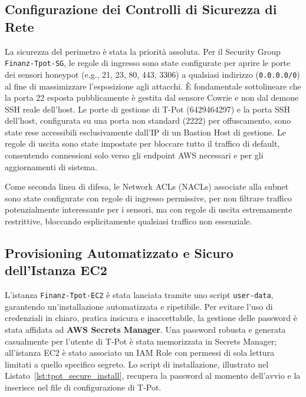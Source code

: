 \subsection{Configurazione dei Controlli di Sicurezza di Rete}
La sicurezza del perimetro è stata la priorità assoluta. Per il Security Group \texttt{Finanz-Tpot-SG}, le regole di ingresso sono state configurate per aprire le porte dei sensori honeypot (e.g., 21, 23, 80, 443, 3306) a qualsiasi indirizzo (\texttt{0.0.0.0/0}) al fine di massimizzare l'esposizione agli attacchi. È fondamentale sottolineare che la porta 22 esposta pubblicamente è gestita dal sensore Cowrie e non dal demone SSH reale dell'host. Le porte di gestione di T-Pot (64294\discretionary{-}{}{-}64297) e la porta SSH dell'host, configurata su una porta non standard (2222) per offuscamento, sono state rese accessibili esclusivamente dall'IP di un Bastion Host di gestione. Le regole di uscita sono state impostate per bloccare tutto il traffico di default, consentendo connessioni solo verso gli endpoint AWS necessari e per gli aggiornamenti di sistema.

Come seconda linea di difesa, le Network ACLs (NACLs) associate alla subnet sono state configurate con regole di ingresso permissive, per non filtrare traffico potenzialmente interessante per i sensori, ma con regole di uscita estremamente restrittive, bloccando esplicitamente qualsiasi traffico non essenziale.

\subsection{Provisioning Automatizzato e Sicuro dell'Istanza EC2}
L'istanza \texttt{Finanz-Tpot-EC2} è stata lanciata tramite uno script \texttt{user-data}, garantendo un'installazione automatizzata e ripetibile. Per evitare l'uso di credenziali in chiaro, pratica insicura e inaccettabile, la gestione delle password è stata affidata ad \textbf{AWS Secrets Manager}. Una password robusta e generata casualmente per l'utente di T-Pot è stata memorizzata in Secrets Manager; all'istanza EC2 è stato associato un IAM Role con permessi di sola lettura limitati a quello specifico segreto. Lo script di installazione, illustrato nel Listato~\ref{lst:tpot_secure_install}, recupera la password al momento dell'avvio e la inserisce nel file di configurazione di T-Pot.

